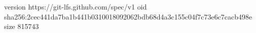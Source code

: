 version https://git-lfs.github.com/spec/v1
oid sha256:2cec441da7ba1b441b0310018092062bdb68d4a3c155c04f7c73e6c7cacb498e
size 815743
